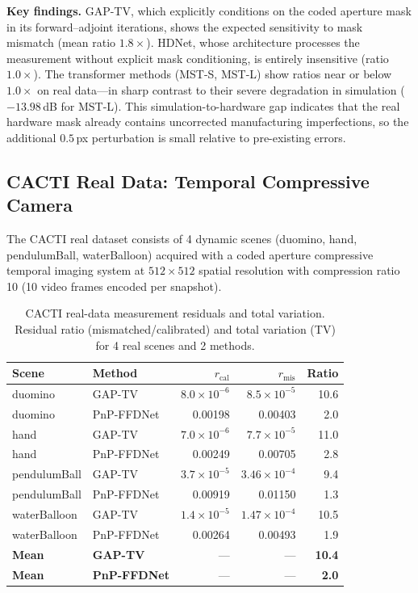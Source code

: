 \documentclass[11pt]{article}
\theoremstyle{definition}
\begin{document}
\noindent\textbf{Key findings.}
GAP-TV, which explicitly conditions on the coded aperture mask in its
forward--adjoint iterations, shows the expected sensitivity to mask mismatch
(mean ratio $1.8\times$).  HDNet, whose architecture processes the
measurement without explicit mask conditioning, is entirely insensitive
(ratio $1.0\times$).  The transformer methods (MST-S, MST-L) show ratios
near or below $1.0\times$ on real data---in sharp contrast to their severe
degradation in simulation ($-13.98$\,dB for MST-L).  This
simulation-to-hardware gap indicates that the real hardware mask already
contains uncorrected manufacturing imperfections, so the additional
$0.5$\,px perturbation is small relative to pre-existing errors.


\subsection{CACTI Real Data: Temporal Compressive Camera}

The CACTI real dataset consists of 4 dynamic scenes (duomino, hand,
pendulumBall, waterBalloon) acquired with a coded aperture compressive
temporal imaging system at $512 \times 512$ spatial resolution with
compression ratio 10 (10 video frames encoded per snapshot).

\begin{table}[htbp]
\centering
\caption{CACTI real-data measurement residuals
and total variation.  Residual ratio (mismatched/calibrated) and
total variation (TV) for 4 real scenes and 2 methods.}
\label{tab:cacti_real}
\begin{tabular}{l l r r r}
\toprule
\textbf{Scene} & \textbf{Method} &
  \textbf{$r_{\mathrm{cal}}$} & \textbf{$r_{\mathrm{mis}}$} &
  \textbf{Ratio} \\
\midrule
duomino       & GAP-TV     & $8.0\times10^{-6}$ & $8.5\times10^{-5}$ & 10.6 \\
duomino       & PnP-FFDNet & 0.00198             & 0.00403             &  2.0 \\
\midrule
hand          & GAP-TV     & $7.0\times10^{-6}$ & $7.7\times10^{-5}$ & 11.0 \\
hand          & PnP-FFDNet & 0.00249             & 0.00705             &  2.8 \\
\midrule
pendulumBall  & GAP-TV     & $3.7\times10^{-5}$ & $3.46\times10^{-4}$ &  9.4 \\
pendulumBall  & PnP-FFDNet & 0.00919             & 0.01150             &  1.3 \\
\midrule
waterBalloon  & GAP-TV     & $1.4\times10^{-5}$ & $1.47\times10^{-4}$ & 10.5 \\
waterBalloon  & PnP-FFDNet & 0.00264             & 0.00493             &  1.9 \\
\midrule
\textbf{Mean} & \textbf{GAP-TV}     & --- & --- & \textbf{10.4} \\
\textbf{Mean} & \textbf{PnP-FFDNet} & --- & --- & \textbf{2.0} \\
\bottomrule
\end{tabular}
\end{table}
\end{document}
